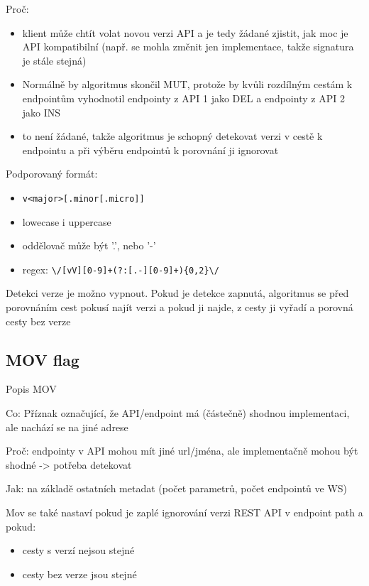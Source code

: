 \documentclass[czech,DP]{thesiskiv}
\begin{document}
Proč: 

\begin{itemize}
	\item klient může chtít volat novou verzi API a je tedy žádané zjistit, jak moc je API kompatibilní (např. se mohla změnit jen implementace, takže signatura je stále stejná)
	
	\item Normálně by algoritmus skončil MUT, protože by kvůli rozdílným cestám k endpointům vyhodnotil endpointy z API 1 jako DEL a endpointy z API 2 jako INS
	
	\item to není žádané, takže algoritmus je schopný detekovat verzi v cestě k endpointu a při výběru endpointů k porovnání ji ignorovat
\end{itemize}

Podporovaný formát:
\begin{itemize}
	\item \verb|v<major>[.minor[.micro]]|
	\item lowecase i uppercase
	\item oddělovač může být '.', nebo '-'
	\item regex: \verb|\/[vV][0-9]+(?:[.-][0-9]+){0,2}\/|
\end{itemize}

Detekci verze je možno vypnout. Pokud je detekce zapnutá, algoritmus se před porovnáním cest pokusí najít verzi a pokud ji najde, z cesty ji vyřadí a porovná cesty bez verze
	
\subsection{MOV flag}	

Popis MOV

Co: Příznak označující, že API/endpoint má (částečně) shodnou implementaci, ale nachází se na jiné adrese

Proč: endpointy v API mohou mít jiné url/jména, ale implementačně mohou být shodné -> potřeba detekovat

Jak: na základě ostatních metadat (počet parametrů, počet endpointů ve WS)

Mov se také nastaví pokud je zaplé ignorování verzi REST API v endpoint path a pokud: 
\begin{itemize}
	\item cesty s verzí nejsou stejné
	\item cesty bez verze jsou stejné
\end{itemize}
\end{document}
